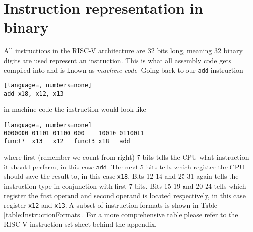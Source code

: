 \section{Instruction representation in binary}\label{section:InstructionRep}
    All instructions in the RISC-V architecture are 32 bits long, meaning 32 binary digits are used represent an instruction. This is what all assembly code gets compiled into and is known as \textit{machine code}.
    Going back to our \texttt{add} instruction 
    \begin{lstlisting}[language=, numbers=none]
add x18, x12, x13
    \end{lstlisting}
    in machine code the instruction would look like
    \begin{lstlisting}[language=, numbers=none]
0000000 01101 01100 000    10010 0110011
funct7  x13   x12   funct3 x18   add
    \end{lstlisting}
    where first (remember we count from right) 7 bits tells the CPU what instruction it should perform, in this case \texttt{add}. The next 5 bits tells which register the CPU should save the result to, in this case \texttt{x18}. Bits 12-14 and 25-31 again tells the instruction type in conjunction with first 7 bits. Bits 15-19 and 20-24 tells which register the first operand and second operand is located respectively, in this case register \texttt{x12} and \texttt{x13}. A subset of instruction formats is shown in Table \ref{table:InstructionFormats}. For a more comprehensive table please refer to the RISC-V instruction set sheet behind the appendix.
    
